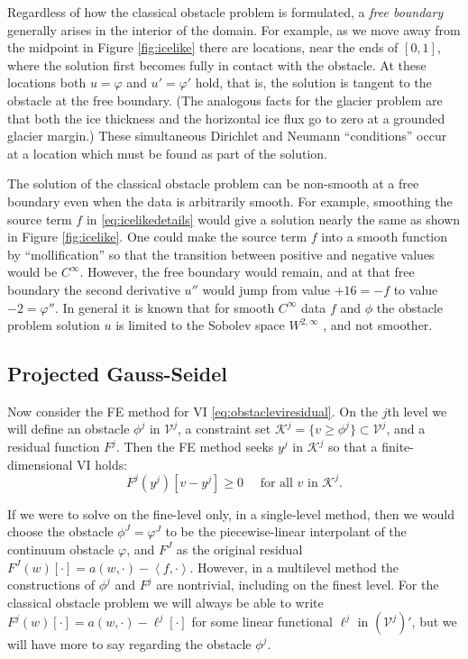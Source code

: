 \documentclass[letterpaper,final,12pt,reqno]{amsart}
\theoremstyle{claim}
\newcommand{\ip}[2]{\left<#1,#2\right>}
\numberwithin{equation}{section}
\numberwithin{figure}{section}
\numberwithin{table}{section}
\numberwithin{theorem}{section}
\begin{document}
Regardless of how the classical obstacle problem is formulated, a \emph{free boundary} generally arises in the interior of the domain.  For example, as we move away from the midpoint in Figure \ref{fig:icelike} there are locations, near the ends of $[0,1]$, where the solution first becomes fully in contact with the obstacle.  At these locations both $u=\varphi$ and $u'=\varphi'$ hold, that is, the solution is tangent to the obstacle at the free boundary.  (The analogous facts for the glacier problem are that both the ice thickness and the horizontal ice flux go to zero at a grounded glacier margin.)  These simultaneous Dirichlet and Neumann ``conditions'' occur at a location which must be found as part of the solution.

The solution of the classical obstacle problem can be non-smooth at a free boundary even when the data is arbitrarily smooth.  For example, smoothing the source term $f$ in \eqref{eq:icelikedetails} would give a solution nearly the same as shown in Figure \ref{fig:icelike}.  One could make the source term $f$ into a smooth function by ``mollification'' \cite{Evans2010} so that the transition between positive and negative values would be $C^\infty$.  However, the free boundary would remain, and at that free boundary the second derivative $u''$ would jump from value $+16=-f$ to value $-2=\varphi''$.  In general it is known that for smooth $C^\infty$ data $f$ and $\phi$ the obstacle problem solution $u$ is limited to the Sobolev space $W^{2,\infty}$ \cite[section IV.6]{KinderlehrerStampacchia1980}, and not smoother.

\subsection*{Projected Gauss-Seidel}  Now consider the FE method for VI \eqref{eq:obstacleviresidual}.  On the $j$th level we will define an obstacle $\phi^j$ in $\mathcal{V}^j$, a constraint set $\mathcal{K}^j = \{v \ge \phi^j\} \subset \mathcal{V}^j$, and a residual function $F^j$.  Then the FE method seeks $y^j$ in $\mathcal{K}^j$ so that a finite-dimensional VI holds:
\begin{equation}
  F^j(y^j)[v-y^j] \ge 0 \quad \text{ for all } v \text{ in } \mathcal{K}^j. \label{eq:feobstacleviresidual}
\end{equation}

If we were to solve on the fine-level only, in a single-level method, then we would choose the obstacle $\phi^J=\varphi^J$ to be the piecewise-linear interpolant of the continuum obstacle $\varphi$, and $F^J$ as the original residual $F^J(w)[\cdot] = a(w,\cdot) - \ip{f}{\cdot}$.  However, in a multilevel method the constructions of $\phi^j$ and $F^j$ are nontrivial, including on the finest level.  For the classical obstacle problem we will always be able to write $F^j(w)[\cdot] = a(w,\cdot) - \ell^j[\cdot]$ for some linear functional $\ell^j$ in $(\mathcal{V}^j)'$, but we will have more to say regarding the obstacle $\phi^j$.
\end{document}
